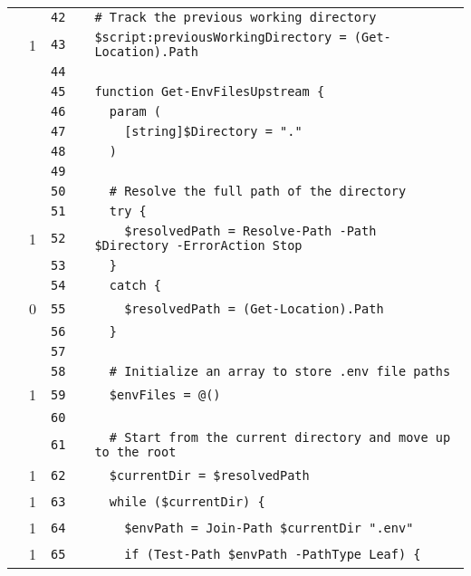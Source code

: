 \documentclass[a4paper,landscape,10pt]{article}
\begin{document}
\begin{longtable}[l]{lrrll}
\cellcolor{gray} &  & \verb~42~ & & \verb~# Track the previous working directory~\\
\cellcolor{green} & 1 & \verb~43~ & & \verb~$script:previousWorkingDirectory = (Get-Location).Path~\\
\cellcolor{gray} &  & \verb~44~ & & \verb~~\\
\cellcolor{gray} &  & \verb~45~ & & \verb~function Get-EnvFilesUpstream {~\\
\cellcolor{gray} &  & \verb~46~ & & \verb~  param (~\\
\cellcolor{gray} &  & \verb~47~ & & \verb~    [string]$Directory = "."~\\
\cellcolor{gray} &  & \verb~48~ & & \verb~  )~\\
\cellcolor{gray} &  & \verb~49~ & & \verb~~\\
\cellcolor{gray} &  & \verb~50~ & & \verb~  # Resolve the full path of the directory~\\
\cellcolor{gray} &  & \verb~51~ & & \verb~  try {~\\
\cellcolor{green} & 1 & \verb~52~ & & \verb~    $resolvedPath = Resolve-Path -Path $Directory -ErrorAction Stop~\\
\cellcolor{gray} &  & \verb~53~ & & \verb~  }~\\
\cellcolor{gray} &  & \verb~54~ & & \verb~  catch {~\\
\cellcolor{red} & 0 & \verb~55~ & & \verb~    $resolvedPath = (Get-Location).Path~\\
\cellcolor{gray} &  & \verb~56~ & & \verb~  }~\\
\cellcolor{gray} &  & \verb~57~ & & \verb~~\\
\cellcolor{gray} &  & \verb~58~ & & \verb~  # Initialize an array to store .env file paths~\\
\cellcolor{green} & 1 & \verb~59~ & & \verb~  $envFiles = @()~\\
\cellcolor{gray} &  & \verb~60~ & & \verb~~\\
\cellcolor{gray} &  & \verb~61~ & & \verb~  # Start from the current directory and move up to the root~\\
\cellcolor{green} & 1 & \verb~62~ & & \verb~  $currentDir = $resolvedPath~\\
\cellcolor{green} & 1 & \verb~63~ & & \verb~  while ($currentDir) {~\\
\cellcolor{green} & 1 & \verb~64~ & & \verb~    $envPath = Join-Path $currentDir ".env"~\\
\cellcolor{green} & 1 & \verb~65~ & & \verb~    if (Test-Path $envPath -PathType Leaf) {~\\

\end{longtable}
\end{document}

